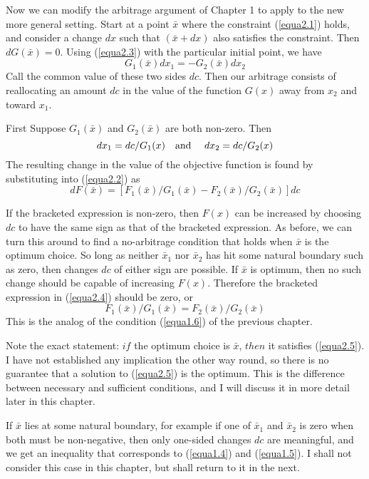 Now we can modify the arbitrage argument of Chapter 1 to apply to the new more general setting. Start at a point $\bar{x}$ where the constraint (\ref{equa2.1}) holds, and consider a change $dx$ such that $(\bar{x}+ dx)$ also satisfies the constraint. Then $dG(\bar{x})=0$. Using (\ref{equa2.3}) with the particular initial point, we have
\begin{equation*}
G_1(\bar{x}) dx_1 = - G_2(\bar{x}) dx_2
\end{equation*}
Call the common value of these two sides $dc$. Then our arbitrage consists of reallocating an amount $dc$ in the value of the function $G(x)$ away from $x_2$ and toward $x_1$.

First Suppose $G_1(\bar{x})$ and $G_2(\bar{x})$ are both non-zero. Then\begin{equation*}
dx_1 = dc / G_1(x)  \mbox{\quad and \quad}   dx_2 = dc / G_2(x)
\end{equation*}
The resulting change in the value of the objective function is found by substituting into (\ref{equa2.2}) as
\begin{equation}\label{equa2.4}
dF(\bar{x}) = [F_1(\bar{x}) / G_1(\bar{x})  - F_2(\bar{x}) / G_2(\bar{x})  ] dc
\end{equation}

If the bracketed expression is non-zero, then $F(x)$ can be increased by choosing $dc$ to have the same sign as that of the bracketed expression. As before, we can turn this around to find a no-arbitrage condition that holds when $\bar{x}$ is the optimum choice. So long as neither $\bar{x}_1$ nor $\bar{x}_2$ has hit some natural boundary such as zero, then changes $dc$ of either sign are possible. If $\bar{x}$ is optimum, then no such change should be capable of increasing $F(x)$. Therefore the bracketed expression in (\ref{equa2.4}) should be zero, or
\begin{equation}\label{equa2.5}
F_1(\bar{x}) / G_1(\bar{x})  = F_2(\bar{x}) / G_2(\bar{x})
\end{equation}
This is the analog of the condition (\ref{equa1.6}) of the previous chapter.

Note the exact statement: $if$ the optimum choice is $\bar{x}$, $then$ it satisfies (\ref{equa2.5}). I have not established any implication the other way round, so there is no guarantee that a solution to (\ref{equa2.5}) is the optimum. This is the difference between necessary and sufficient conditions, and I will discuss it in more detail later in this chapter.

If $\bar{x}$ lies at some natural boundary, for example if one of $\bar{x}_1$ and $\bar{x}_2$ is zero when both must be non-negative, then only one-sided changes $dc$ are meaningful, and we get an inequality that corresponds to (\ref{equa1.4}) and (\ref{equa1.5}). I shall not consider this case in this chapter, but shall return to it in the next.

